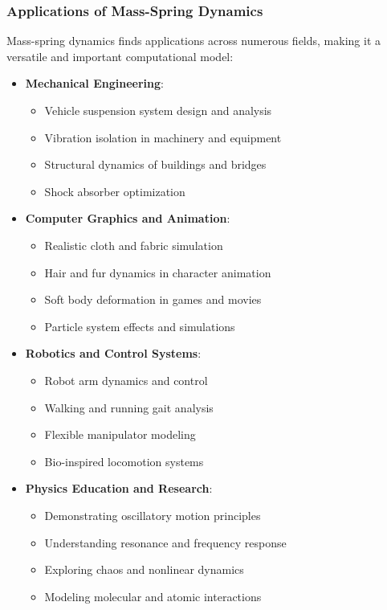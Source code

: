 \subsubsection{Applications of Mass-Spring Dynamics}

Mass-spring dynamics finds applications across numerous fields, making it a versatile and important computational model:

\begin{itemize}
    \item \textbf{Mechanical Engineering}:
    \begin{itemize}
        \item Vehicle suspension system design and analysis
        \item Vibration isolation in machinery and equipment
        \item Structural dynamics of buildings and bridges
        \item Shock absorber optimization
    \end{itemize}
    
    \item \textbf{Computer Graphics and Animation}:
    \begin{itemize}
        \item Realistic cloth and fabric simulation
        \item Hair and fur dynamics in character animation
        \item Soft body deformation in games and movies
        \item Particle system effects and simulations
    \end{itemize}
    
    \item \textbf{Robotics and Control Systems}:
    \begin{itemize}
        \item Robot arm dynamics and control
        \item Walking and running gait analysis
        \item Flexible manipulator modeling
        \item Bio-inspired locomotion systems
    \end{itemize}
    
    \item \textbf{Physics Education and Research}:
    \begin{itemize}
        \item Demonstrating oscillatory motion principles
        \item Understanding resonance and frequency response
        \item Exploring chaos and nonlinear dynamics
        \item Modeling molecular and atomic interactions
    \end{itemize}
    

\end{itemize}
